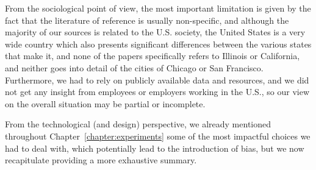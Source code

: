 From the sociological point of view, the most important limitation is given by the fact that the literature of reference is usually non-specific, and although the majority of our sources is related to the U.S. society, the United States is a very wide country which also presents significant differences between the various states that make it, and none of the papers specifically refers to Illinois or California, and neither goes into detail of the cities of Chicago or San Francisco. Furthermore, we had to rely on publicly available data and resources, and we did not get any insight from employees or employers working in the U.S., so our view on the overall situation may be partial or incomplete.

From the technological (and design) perspective, we already mentioned throughout Chapter~\ref{chapter:experiments} some of the most impactful choices we had to deal with, which potentially lead to the introduction of bias, but we now recapitulate providing a more exhaustive summary.
